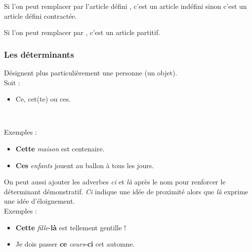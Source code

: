 \documentclass[10pt, french]{article}
\begin{document}
\begin{multicols*}{2}
\begin{astuces}
Si l'on peut remplacer  par l'article défini , c'est un article indéfini sinon c'est un article défini contractée.
\end{astuces}

\begin{astuces}
Si l'on peut remplacer  par , c'est un article partitif.
\end{astuces}


\subsubsection{Les déterminants}
\begin{definitionNOHFILLsub}
Désignent plus particulièrement une personne (un objet).\\

Soit :
\begin{itemize}
	\item	Ce, cet(te) ou ces.
\end{itemize}

\

Exemples :
\begin{itemize}
	\item	\textbf{Cette} \textit{maison} est centenaire.
	\item	\textbf{Ces} \textit{enfants} jouent au ballon à tous les jours.
\end{itemize}
\end{definitionNOHFILLsub}
\begin{astuces}
On peut aussi ajouter les adverbes \textit{ci} et \textit{là} après le nom pour renforcer le déterminant démonstratif. \textit{Ci} indique une idée de proximité alors que \textit{là} exprime une idée d'éloignement.	\\

Exemples : 
\begin{itemize}
	\item	\textbf{Cette} \textit{fille}-\textbf{là} est tellement gentille ! 
	\item	Je dois passer \textbf{ce} \textit{cours}-\textbf{ci} cet automne.
\end{itemize}
\end{astuces}


\end{multicols*}
\end{document}
